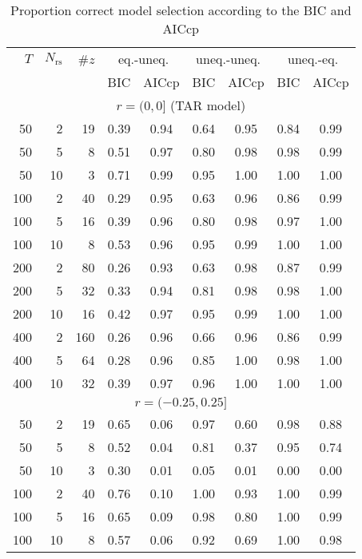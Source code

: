 \begin{table}
\caption{Proportion correct model selection according to the BIC and AICcp}
\begin{tabular}{rrr cc cc cc}
\hline
$T$ & $N_{\mathrm{rs}}$ & \#$z$ & \multicolumn{2}{c}{eq.-uneq.} & \multicolumn{2}{c}{uneq.-uneq.} & \multicolumn{2}{c}{uneq.-eq.} \\
\cline{4-9}
\multicolumn{3}{l}{} & BIC & AICcp & BIC & AICcp & BIC & AICcp \\
\hline
  \multicolumn{9}{c}{$r = (0, 0]$ (TAR model)} \\
  50  & 2  & 19  & 0.39 & 0.94 & 0.64 & 0.95 & 0.84 & 0.99 \\ 
  50  & 5  & 8   & 0.51 & 0.97 & 0.80 & 0.98 & 0.98 & 0.99 \\ 
  50  & 10 & 3   & 0.71 & 0.99 & 0.95 & 1.00 & 1.00 & 1.00 \\ 
  100 & 2  & 40  & 0.29 & 0.95 & 0.63 & 0.96 & 0.86 & 0.99 \\ 
  100 & 5  & 16  & 0.39 & 0.96 & 0.80 & 0.98 & 0.97 & 1.00 \\ 
  100 & 10 & 8   & 0.53 & 0.96 & 0.95 & 0.99 & 1.00 & 1.00 \\ 
  200 & 2  & 80  & 0.26 & 0.93 & 0.63 & 0.98 & 0.87 & 0.99 \\ 
  200 & 5  & 32  & 0.33 & 0.94 & 0.81 & 0.98 & 0.98 & 1.00 \\ 
  200 & 10 & 16  & 0.42 & 0.97 & 0.95 & 0.99 & 1.00 & 1.00 \\ 
  400 & 2  & 160 & 0.26 & 0.96 & 0.66 & 0.96 & 0.86 & 0.99 \\ 
  400 & 5  & 64  & 0.28 & 0.96 & 0.85 & 1.00 & 0.98 & 1.00 \\ 
  400 & 10 & 32  & 0.39 & 0.97 & 0.96 & 1.00 & 1.00 & 1.00 \\
  \hline
  \multicolumn{9}{c}{$r = (-0.25, 0.25]$ } \\
  50  & 2  & 19  & 0.65 & 0.06 & 0.97 & 0.60 & 0.98 & 0.88 \\ 
  50  & 5  & 8   & 0.52 & 0.04 & 0.81 & 0.37 & 0.95 & 0.74 \\ 
  50  & 10 & 3   & 0.30 & 0.01 & 0.05 & 0.01 & 0.00 & 0.00 \\
  100 & 2  & 40  & 0.76 & 0.10 & 1.00 & 0.93 & 1.00 & 0.99 \\ 
  100 & 5  & 16  & 0.65 & 0.09 & 0.98 & 0.80 & 1.00 & 0.99 \\ 
  100 & 10 & 8   & 0.57 & 0.06 & 0.92 & 0.69 & 1.00 & 0.98 \\ 

\end{tabular}
\end{table}
